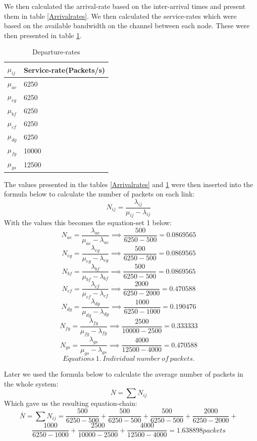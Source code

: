 \documentclass{article}
\begin{document}
We then calculated the arrival-rate based on the inter-arrival times and present them in table \ref{Arrivalrates}. We then calculated the service-rates which were based on the available bandwidth on the channel between each node. These were then presented in table \ref{departurerates}.
\begin{table}[h]
\centering
\label{departurerates}
\caption{Departure-rates}
\begin{tabular}{|l|l|}
\hline
$\mu_{ij}$ & Service-rate(Packets/s)\\ \hline
$\mu_{ae}$ & 6250 \\ \hline
$\mu_{eg}$ & 6250 \\ \hline
$\mu_{bf}$ & 6250 \\ \hline
$\mu_{cf}$ & 6250 \\ \hline
$\mu_{dg}$ & 6250 \\ \hline
$\mu_{fg}$ & 10000 \\ \hline
$\mu_{gs}$ & 12500 \\ \hline
\end{tabular}
\end{table}
The values presented in the tables \ref{Arrivalrates} and \ref{departurerates} were then inserted into the
formula below to calculate the number of packets on each link:
$$N_{ij} = \frac{\lambda_{ij}}{\mu_{ij} - \lambda_{ij} }$$
With the values this becomes the equation-set 1 below:
$$N_{ae} = \frac{\lambda_{ae}}{\mu_{ae} - \lambda_{ae} } \implies \frac{500}{6250 - 500 } = 0.0869565 $$
$$N_{eg} = \frac{\lambda_{eg}}{\mu_{eg} - \lambda_{eg} } \implies \frac{500}{6250 - 500 } = 0.0869565 $$
$$N_{bf} = \frac{\lambda_{bf}}{\mu_{bf} - \lambda_{bf} } \implies \frac{500}{6250 - 500 } = 0.0869565 $$
$$N_{cf} = \frac{\lambda_{cf}}{\mu_{cf} - \lambda_{cf} } \implies \frac{2000}{6250 - 2000 } = 0.470588 $$
$$N_{dg} = \frac{\lambda_{dg}}{\mu_{dg} - \lambda_{dg} } \implies \frac{1000}{6250 - 1000 } = 0.190476 $$
$$N_{fg} = \frac{\lambda_{fg}}{\mu_{fg} - \lambda_{fg} } \implies \frac{2500}{10000 - 2500 } = 0.333333 $$
$$N_{gs} = \frac{\lambda_{gs}}{\mu_{gs} - \lambda_{gs} } \implies \frac{4000}{12500 - 4000 } = 0.470588 $$
$$Equations\ 1.\ Individual\ number\ of\ packets.$$

Later we used the formula below to calculate the average number of packets in the whole system:
$$ \overline{N} = \sum N_{ij} $$
Which gave us the resulting equation-chain:
$$ \overline{N} = \sum N_{ij} = \frac{500}{6250 - 500 } + \frac{500}{6250 - 500 } + \frac{500}{6250 - 500 } + \frac{2000}{6250 - 2000 } + $$ 
$$ \frac{1000}{6250 - 1000 } + \frac{2500}{10000 - 2500 } + \frac{4000}{12500 - 4000 } = 1.638898 packets $$ 
\end{document}

